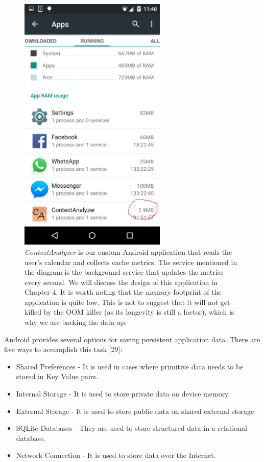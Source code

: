 \documentclass[12pt]{uthesis-v12}  %
\begin{document}
			\begin{figure}[h]
				\centering
				\includegraphics[width = 70mm]{images/lowMemory.png}
				\caption[Memory Occupied by the Background Service]{{\em ContextAnalyzer} is our custom Android application that reads the user's calendar and collects cache metrics. The service mentioned in the diagram is the background service that updates the metrics every second. We will discuss the design of this application in Chapter 4. It is worth noting that the memory footprint of the application is quite low. This is not to suggest that it will not get killed by the OOM killer (as its longevity is still a factor), which is why we are backing the data up.}
			\end{figure} 

			Android provides several options for saving persistent application data. There are five ways to accomplish this task [29]:
			
			\begin{itemize}
				\item Shared Preferences - It is used in cases where primitive data needs to be stored in Key Value pairs.
				\item Internal Storage - It is used to store private data on device memory.
				\item External Storage - It is used to store public data on shared external storage
				\item SQLite Databases - They are used to store structured data in a relational database.
				\item Network Connection - It is used to store data over the Internet.
			\end{itemize}
			
\end{document}
